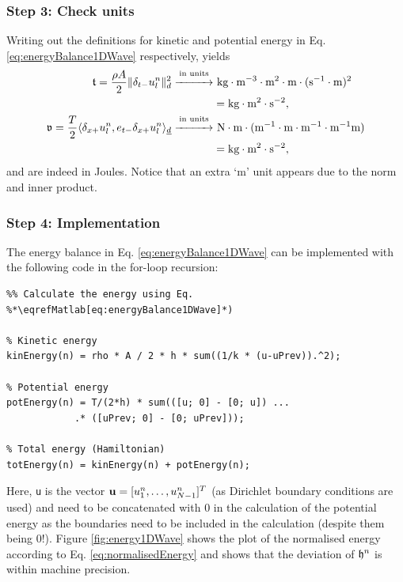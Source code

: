 {{\subsubsection{Step 3: Check units}
Writing out the definitions for kinetic and potential energy in Eq. \eqref{eq:energyBalance1DWave} respectively, yields
\begin{align*}
    \mathfrak{t} = \frac{\rho A}{2}\lVert\delta_{t-} u_l^n\rVert^2_d \overset{\text{in units}}{\xrightarrow{\hspace*{1cm}}}& \ \text{kg}\cdot \text{m}^{-3} \cdot \text{m}^2\cdot \text{m} \cdot(\text{s}^{-1}\cdot \text{m})^{2}\\
    & = \text{kg}\cdot\text{m}^2\cdot\text{s}^{-2},\\
    \mathfrak{v} = \frac{T}{2}\langle\delta_{x+}u_l^n, e_{t-}\delta_{x+}u_l^n\rangle_{\underline{d}}\overset{\text{in units}}{\xrightarrow{\hspace*{1cm}}}& \ \text{N} \cdot \text{m}\cdot (\text{m}^{-1}\cdot\text{m}\cdot \text{m}^{-1}\cdot\text{m}^{-1}\text{m}) \\
    & = \text{kg} \cdot \text{m}^2 \cdot \text{s}^{-2},
\end{align*}
and are indeed in Joules. Notice that an extra `m' unit appears due to the norm and inner product.

\subsubsection{Step 4: Implementation}
The energy balance in Eq. \eqref{eq:energyBalance1DWave} can be implemented with the following code in the for-loop recursion:
\setlstMAT
\begin{lstlisting}
%% Calculate the energy using Eq. %*\eqrefMatlab[eq:energyBalance1DWave]*) 

% Kinetic energy
kinEnergy(n) = rho * A / 2 * h * sum((1/k * (u-uPrev)).^2);

% Potential energy
potEnergy(n) = T/(2*h) * sum(([u; 0] - [0; u]) ...
            .* ([uPrev; 0] - [0; uPrev]));

% Total energy (Hamiltonian)
totEnergy(n) = kinEnergy(n) + potEnergy(n);
\end{lstlisting}
Here, \texttt{u} is the vector $\mathbf{u} = [u_1^n, \hdots, u_{N-1}^n]^T$ (as Dirichlet boundary conditions are used) and need to be concatenated with $0$ in the calculation of the potential energy as the boundaries need to be included in the calculation (despite them being 0!).
Figure \ref{fig:energy1DWave} shows the plot of the normalised energy according to Eq. \eqref{eq:normalisedEnergy} and shows that the deviation of $\mathfrak{h}^n$ is within machine precision.


}}
